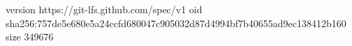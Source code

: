 version https://git-lfs.github.com/spec/v1
oid sha256:757de5e680e5a24ccfd680047c905032d87d4994bf7b40655ad9ec138412b160
size 349676
